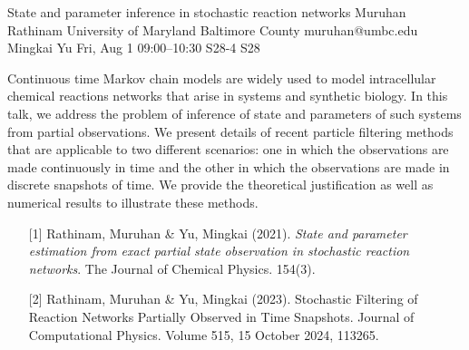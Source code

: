 \begin{talk}
  {State and parameter inference in stochastic reaction networks}%
  {Muruhan Rathinam}%
  {University of Maryland Baltimore County}%
  {muruhan@umbc.edu}%
  {Mingkai Yu}%
  {}%
  {Fri, Aug 1 09:00–10:30}%
  {S28-4}%
  {S28}%
  
				
Continuous time Markov chain models are widely used to model intracellular chemical reactions networks that arise in systems and synthetic biology. In this talk, we address the problem of inference of state and parameters of such systems from partial observations. We present details of recent particle filtering methods that are applicable to two different scenarios: one in which the observations are made continuously in time and the other in which the observations are made in discrete snapshots of time.            We provide the theoretical justification as well as numerical results to illustrate these methods.       
			
\medskip

\begin{enumerate}
	\item[{[1]}] Rathinam, Muruhan \& Yu, Mingkai (2021). {\it State and parameter estimation from exact partial state observation in stochastic reaction networks}. The Journal of Chemical Physics. 
 154(3).
	\item[{[2]}] Rathinam, Muruhan \& Yu, Mingkai (2023). Stochastic Filtering of Reaction Networks Partially Observed in Time Snapshots. Journal of Computational Physics. 
Volume 515, 15 October 2024, 113265. 

\end{enumerate}

\end{talk}

